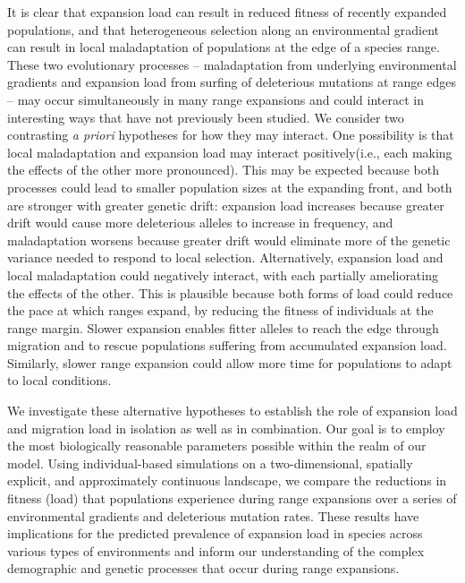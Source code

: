 It is clear that expansion load can result in reduced fitness of recently expanded populations, and that heterogeneous selection along an environmental gradient can result in local maladaptation of populations at the edge of a species range. These two evolutionary processes -- maladaptation from underlying environmental gradients and expansion load from surfing of deleterious mutations at range edges -- may occur simultaneously in many range expansions and could interact in interesting ways that have not previously been studied. We consider two contrasting \emph{a priori} hypotheses for how they may interact. One possibility is that local maladaptation and expansion load may interact positively(i.e., each making the effects of the other more pronounced). This may be expected because both processes could lead to smaller population sizes at the expanding front, and both are stronger with greater genetic drift: expansion load increases because greater drift would cause more deleterious alleles to increase in frequency, and maladaptation worsens because greater drift would eliminate more of the genetic variance needed to respond to local selection. Alternatively, expansion load and local maladaptation could negatively interact, with each partially ameliorating the effects of the other. This is plausible because both forms of load could reduce the pace at which ranges expand, by reducing the fitness of individuals at the range margin. Slower expansion enables fitter alleles to reach the edge through migration and to rescue populations suffering from accumulated expansion load. Similarly, slower range expansion could allow more time for populations to adapt to local conditions.

We investigate these alternative hypotheses to establish the role of expansion load and migration load in isolation as well as in combination. Our goal is to employ the most biologically reasonable parameters possible within the realm of our model. Using individual-based simulations on a two-dimensional, spatially explicit, and approximately continuous landscape, we compare the reductions in fitness (load) that populations experience during range expansions over a series of environmental gradients and deleterious mutation rates. These results have implications for the predicted prevalence of expansion load in species across various types of environments and inform our understanding of the complex demographic and genetic processes that occur during range expansions. 


